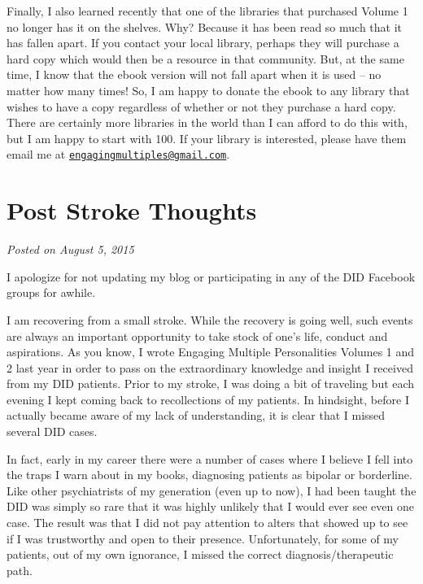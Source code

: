 \documentclass[]{book}
\begin{document}
Finally, I also learned recently that one of the libraries that purchased Volume 1 no longer has it on the shelves. Why? Because it has been read so much that it has fallen apart. If you contact your local library, perhaps they will purchase a hard copy which would then be a resource in that community. But, at the same time, I know that the ebook version will not fall apart when it is used -- no matter how many times! So, I am happy to donate the ebook to any library that wishes to have a copy regardless of whether or not they purchase a hard copy. There are certainly more libraries in the world than I can afford to do this with, but I am happy to start with 100. If your library is interested, please have them email me at \href{mailto:engagingmultiples@gmail.com}{\nolinkurl{engagingmultiples@gmail.com}}.

\hypertarget{post-stroke-thoughts}{%
\section{Post Stroke Thoughts}\label{post-stroke-thoughts}}

\emph{Posted on August 5, 2015}

I apologize for not updating my blog or participating in any of the DID Facebook groups for awhile.

I am recovering from a small stroke. While the recovery is going well, such events are always an important opportunity to take stock of one's life, conduct and aspirations. As you know, I wrote Engaging Multiple Personalities Volumes 1 and 2 last year in order to pass on the extraordinary knowledge and insight I received from my DID patients. Prior to my stroke, I was doing a bit of traveling but each evening I kept coming back to recollections of my patients. In hindsight, before I actually became aware of my lack of understanding, it is clear that I missed several DID cases.

In fact, early in my career there were a number of cases where I believe I fell into the traps I warn about in my books, diagnosing patients as bipolar or borderline. Like other psychiatrists of my generation (even up to now), I had been taught the DID was simply so rare that it was highly unlikely that I would ever see even one case. The result was that I did not pay attention to alters that showed up to see if I was trustworthy and open to their presence. Unfortunately, for some of my patients, out of my own ignorance, I missed the correct diagnosis/therapeutic path.
\end{document}
